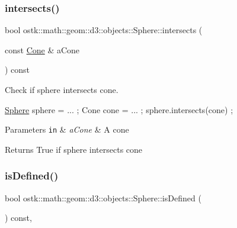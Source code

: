 \subsubsection{\texorpdfstring{intersects()}{intersects()}\hspace{0.1cm}{\footnotesize\ttfamily [9/9]}}
{\footnotesize\ttfamily bool ostk\+::math\+::geom\+::d3\+::objects\+::\+Sphere\+::intersects (\begin{DoxyParamCaption}\item[{const \hyperlink{classostk_1_1math_1_1geom_1_1d3_1_1objects_1_1_cone}{Cone} \&}]{a\+Cone }\end{DoxyParamCaption}) const}



Check if sphere intersects cone. 


\begin{DoxyCode}
\hyperlink{classostk_1_1math_1_1geom_1_1d3_1_1objects_1_1_sphere_a6920f72260a7b2c9ffc29283540e16c2}{Sphere} sphere = ... ;
Cone cone = ... ;
sphere.intersects(cone) ;
\end{DoxyCode}



\begin{DoxyParams}[1]{Parameters}
\mbox{\tt in}  & {\em a\+Cone} & A cone \\
\hline
\end{DoxyParams}
\begin{DoxyReturn}{Returns}
True if sphere intersects cone 
\end{DoxyReturn}
\mbox{\label{classostk_1_1math_1_1geom_1_1d3_1_1objects_1_1_sphere_ab236f8c380bcc2164a5a606fdf8bc3a6}} 
\subsubsection{\texorpdfstring{is\+Defined()}{isDefined()}}
{\footnotesize\ttfamily bool ostk\+::math\+::geom\+::d3\+::objects\+::\+Sphere\+::is\+Defined (\begin{DoxyParamCaption}{ }\end{DoxyParamCaption}) const\hspace{0.3cm}{\ttfamily [override]}, {\ttfamily [virtual]}}



